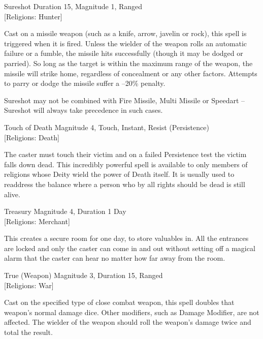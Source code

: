 \begin{rpg-spell}
{Sureshot}
{Duration 15, Magnitude 1, Ranged\\{[Religions: Hunter]}}

Cast on a missile weapon (such as a knife, arrow, javelin or rock), this spell is triggered when it is fired. Unless the wielder of the weapon rolls an automatic failure or a fumble, the missile hits successfully (though it may be dodged or parried). So long as the target is within the maximum range of the weapon, the missile will strike home, regardless of concealment or any other factors. Attempts to parry or dodge the missile suffer a –20\% penalty. 

Sureshot may not be combined with Fire Missile, Multi Missile or Speedart – Sureshot will always take precedence in such cases. 
\end{rpg-spell}

\begin{rpg-spell}
{Touch of Death}
{Magnitude 4, Touch, Instant, Resist (Persistence)\\{[Religions: Death]}}

The caster must touch their victim and on a failed Persistence test the victim falls down dead. This incredibly powerful spell is available to only members of religions whose Deity wield the power of Death itself. It is usually used to readdress the balance where a person who by all rights should be dead is still alive. 
\end{rpg-spell}

\begin{rpg-spell}
{Treasury}
{Magnitude 4, Duration 1 Day\\{[Religions: Merchant]}}

This creates a secure room for one day, to store valuables in. All the entrances are locked and only the caster can come in and out without setting off a magical alarm that the caster can hear no matter how far away from the room.
\end{rpg-spell}

\begin{rpg-spell}
{True (Weapon)}
{Magnitude 3, Duration 15, Ranged\\{[Religions: War]}}

Cast on the specified type of close combat weapon, this spell doubles that weapon’s normal damage dice. Other modifiers, such as Damage Modifier, are not affected. The wielder of the weapon should roll the weapon’s damage twice and total the result.
\end{rpg-spell}

